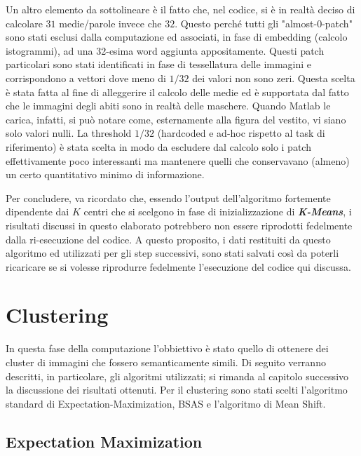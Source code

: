 \documentclass[]{report}
\begin{document}
	Un altro elemento da sottolineare è il fatto che, nel codice, si è in realtà deciso di calcolare $31$ medie/parole invece che $32$. Questo perché tutti gli "almost-0-patch" sono stati esclusi dalla computazione ed associati, in fase di embedding (calcolo istogrammi), ad una 32-esima word aggiunta appositamente. Questi patch particolari sono stati identificati in fase di tessellatura delle immagini e corrispondono a vettori dove meno di $1/32$ dei valori non sono zeri. Questa scelta è stata fatta al fine di alleggerire il calcolo delle medie ed è supportata dal fatto che le immagini degli abiti sono in realtà delle maschere. Quando Matlab le carica, infatti, si può notare come, esternamente alla figura del vestito, vi siano solo valori nulli. La threshold $1/32$ (hardcoded e ad-hoc rispetto al task di riferimento) è stata scelta in modo da escludere dal calcolo solo i patch effettivamente poco interessanti ma mantenere quelli che conservavano (almeno) un certo quantitativo minimo di informazione. 

	Per concludere, va ricordato che, essendo l'output dell'algoritmo fortemente dipendente dai $K$ centri che si scelgono in fase di inizializzazione di {\bf{ \it K-Means}}, i risultati discussi in questo elaborato potrebbero non essere riprodotti fedelmente dalla ri-esecuzione del codice. A questo proposito, i dati restituiti da questo algoritmo ed utilizzati per gli step successivi, sono stati salvati così da poterli ricaricare se si volesse riprodurre fedelmente l'esecuzione del codice qui discussa. 
	

\chapter*{\huge Clustering}

	In questa fase della computazione l'obbiettivo è stato quello di ottenere dei cluster di immagini che fossero semanticamente simili. Di seguito verranno descritti, in particolare, gli algoritmi utilizzati; si rimanda al capitolo successivo la discussione dei risultati ottenuti. Per il clustering sono stati scelti l'algoritmo standard di Expectation-Maximization, BSAS e l'algoritmo di Mean Shift.  
	

\section*{Expectation Maximization}
\end{document}
